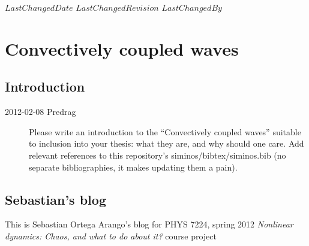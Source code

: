 {$LastChangedDate$}
{$LastChangedRevision$} {$LastChangedBy$}

\chapter{Convectively coupled waves}
\label{chap:OrtegaBlog}

\section{Introduction}
\label{sect:CCWs}

\begin{description}

\item[2012-02-08 Predrag] Please write an introduction to
the ``Convectively coupled waves'' suitable to inclusion into
your thesis: what they are, and why should one care. Add relevant references
to this repository's siminos/bibtex/siminos.bib (no separate bibliographies,
it makes updating them a pain).

\end{description}

\section{Sebastian's blog}
\label{sect:OrtegaDaily}

This is Sebastian Ortega Arango's blog for PHYS 7224,  spring 2012
\emph{Nonlinear dynamics: Chaos, and what to do about it?} course project

